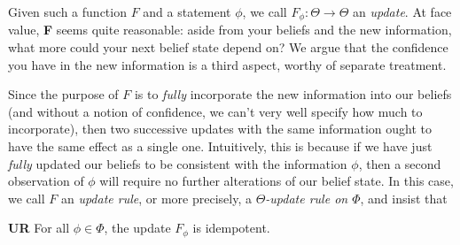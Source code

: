 Given such a function $F$ and a statement $\phi$, we call $F_\phi : \Theta \to \Theta$ an \emph{update}.
At face value, \textbf{F} seems quite reasonable:
aside from your beliefs and the new information, what more could your next belief state depend on?
We argue that the confidence you have in the new information is a third aspect, worthy of separate treatment.

Since the purpose of $F$ is to \emph{fully} incorporate the new information into our beliefs
(and without a notion of confidence, we can't very well specify how much to incorporate),
then
two successive updates with the same information ought to have the same effect as a single one.
Intuitively, this is because if we have just \emph{fully} updated our beliefs to be consistent with the information $\phi$, then a second observation of $\phi$ will require no further alterations of our belief state.
In this case, we call $F$ an \emph{update rule}, or more precisely, a \emph{$\Theta$-update rule on $\Phi$}, and insist that
\begin{CFaxioms}
	\item[\textbf{UR}] For all $\phi \in \Phi$, the update $F_\phi$ is
	idempotent.
\end{CFaxioms}



